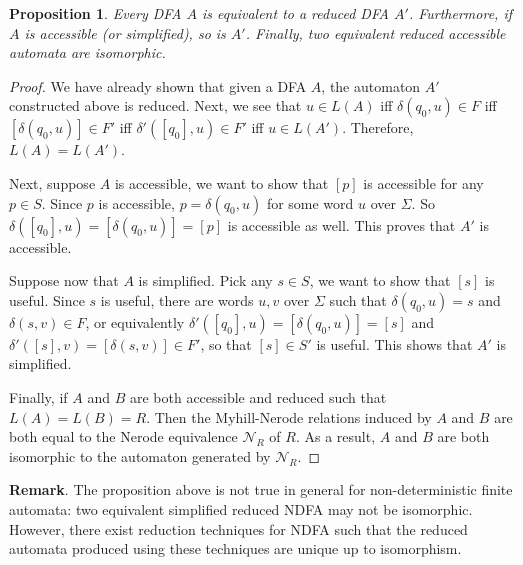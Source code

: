 \documentclass[12pt]{article}
\newtheorem{prop}{Proposition}
\begin{document}
\begin{prop} Every DFA $A$ is equivalent to a reduced DFA $A'$. Furthermore, if $A$ is accessible (or simplified), so is $A'$.  Finally, two equivalent reduced accessible automata are isomorphic.  \end{prop}
\begin{proof}  We have already shown that given a DFA $A$, the automaton $A'$ constructed above is reduced.  Next, we see that $u \in L(A)$ iff $\delta(q_0,u)\in F$ iff $[\delta(q_0,u)]\in F'$ iff $\delta'([q_0],u)\in F'$ iff $u\in L(A')$.  Therefore, $L(A)=L(A')$.

Next, suppose $A$ is accessible, we want to show that $[p]$ is accessible for any $p\in S$.  Since $p$ is accessible, $p=\delta(q_0,u)$ for some word $u$ over $\Sigma$.  So $\delta([q_0],u)=[\delta(q_0,u)]=[p]$ is accessible as well.  This proves that $A'$ is accessible.

Suppose now that $A$ is simplified.  Pick any $s\in S$, we want to show that $[s]$ is useful.  Since $s$ is useful, there are words $u,v$ over $\Sigma$ such that $\delta(q_0,u)=s$ and $\delta(s,v)\in F$, or equivalently $\delta'([q_0],u)=[\delta(q_0,u)]=[s]$ and $\delta'([s],v)=[\delta(s,v)]\in F'$, so that $[s]\in S'$ is useful. This shows that $A'$ is simplified.

Finally, if $A$ and $B$ are both accessible and reduced such that $L(A)=L(B)=R$.  Then the Myhill-Nerode relations induced by $A$ and $B$ are both equal to the Nerode equivalence $\mathcal{N}_R$ of $R$.  As a result, $A$ and $B$ are both isomorphic to the automaton generated by $\mathcal{N}_R$.
\end{proof}

\textbf{Remark}.  The proposition above is not true in general for non-deterministic finite automata: two equivalent simplified reduced NDFA may not be isomorphic.  However, there exist reduction techniques for NDFA such that the reduced automata produced using these techniques are unique up to isomorphism.
\end{document}

